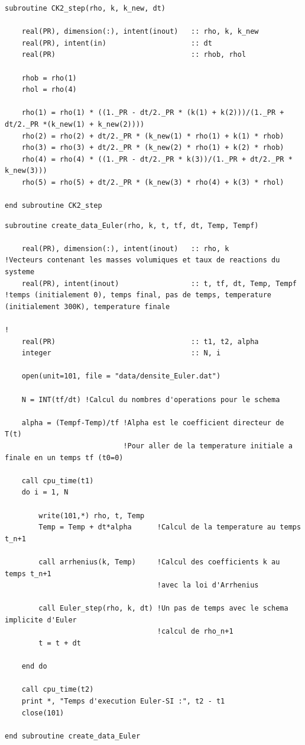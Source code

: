 \documentclass[a4paper,11pt]{article}
\begin{document}
\begin{lstlisting}[caption={Procédure \texttt{CK2\_step}}, label={lst:ck2_step}]
subroutine CK2_step(rho, k, k_new, dt)

    real(PR), dimension(:), intent(inout)   :: rho, k, k_new
    real(PR), intent(in)                    :: dt
    real(PR)                                :: rhob, rhol

    rhob = rho(1)
    rhol = rho(4)

    rho(1) = rho(1) * ((1._PR - dt/2._PR * (k(1) + k(2)))/(1._PR + dt/2._PR *(k_new(1) + k_new(2))))
    rho(2) = rho(2) + dt/2._PR * (k_new(1) * rho(1) + k(1) * rhob)
    rho(3) = rho(3) + dt/2._PR * (k_new(2) * rho(1) + k(2) * rhob)
    rho(4) = rho(4) * ((1._PR - dt/2._PR * k(3))/(1._PR + dt/2._PR * k_new(3)))
    rho(5) = rho(5) + dt/2._PR * (k_new(3) * rho(4) + k(3) * rhol)

end subroutine CK2_step
\end{lstlisting}

\begin{lstlisting}[caption={Procédure \texttt{create\_data\_Euler}}]
subroutine create_data_Euler(rho, k, t, tf, dt, Temp, Tempf)

    real(PR), dimension(:), intent(inout)   :: rho, k                   !Vecteurs contenant les masses volumiques et taux de reactions du systeme
    real(PR), intent(inout)                 :: t, tf, dt, Temp, Tempf   !temps (initialement 0), temps final, pas de temps, temperature (initialement 300K), temperature finale 
                                                                        !
    real(PR)                                :: t1, t2, alpha
    integer                                 :: N, i

    open(unit=101, file = "data/densite_Euler.dat")
    
    N = INT(tf/dt) !Calcul du nombres d'operations pour le schema

    alpha = (Tempf-Temp)/tf !Alpha est le coefficient directeur de T(t)
                            !Pour aller de la temperature initiale a finale en un temps tf (t0=0)

    call cpu_time(t1)
    do i = 1, N

        write(101,*) rho, t, Temp
        Temp = Temp + dt*alpha      !Calcul de la temperature au temps t_n+1

        call arrhenius(k, Temp)     !Calcul des coefficients k au temps t_n+1
                                    !avec la loi d'Arrhenius
                                    
        call Euler_step(rho, k, dt) !Un pas de temps avec le schema implicite d'Euler
                                    !calcul de rho_n+1
        t = t + dt
    
    end do
    
    call cpu_time(t2)
    print *, "Temps d'execution Euler-SI :", t2 - t1
    close(101)

end subroutine create_data_Euler
\end{lstlisting}
\end{document}
